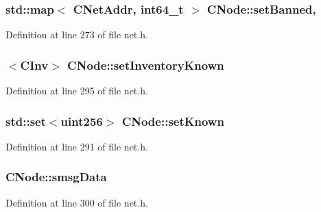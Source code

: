 \hypertarget{class_c_node_adf22d1873c1012ab3edb8a52253b203e}{}
\subsubsection[{set\+Banned}]{\setlength{\rightskip}{0pt plus 5cm}std\+::map$<$ {\bf C\+Net\+Addr}, {\bf int64\+\_\+t} $>$ C\+Node\+::set\+Banned\hspace{0.3cm}{\ttfamily [static]}, {\ttfamily [protected]}}\label{class_c_node_adf22d1873c1012ab3edb8a52253b203e}


Definition at line 273 of file net.\+h.

\hypertarget{class_c_node_ae15aa9a971040800c26bc87b1250220f}{}
\subsubsection[{set\+Inventory\+Known}]{$<${\bf C\+Inv}$>$ C\+Node\+::set\+Inventory\+Known}\label{class_c_node_ae15aa9a971040800c26bc87b1250220f}


Definition at line 295 of file net.\+h.

\hypertarget{class_c_node_ab1b30fa8e48005752f6b0bcf43eca478}{}
\subsubsection[{set\+Known}]{\setlength{\rightskip}{0pt plus 5cm}std\+::set$<${\bf uint256}$>$ C\+Node\+::set\+Known}\label{class_c_node_ab1b30fa8e48005752f6b0bcf43eca478}


Definition at line 291 of file net.\+h.

\hypertarget{class_c_node_a739eeb371b83583a159b0b9d386737b9}{}
\subsubsection[{smsg\+Data}]{ C\+Node\+::smsg\+Data}\label{class_c_node_a739eeb371b83583a159b0b9d386737b9}


Definition at line 300 of file net.\+h.

